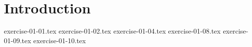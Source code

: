 \documentclass[english, a4paper, 12pt] {article}
\begin{document}
\section{Introduction}
{exercise-01-01.tex}
{exercise-01-02.tex}
{exercise-01-04.tex}
{exercise-01-08.tex}
{exercise-01-09.tex}
{exercise-01-10.tex}
\end{document}
